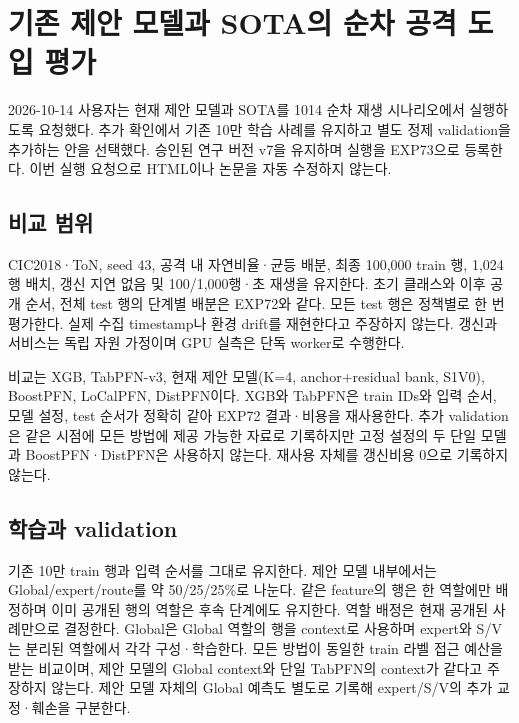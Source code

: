 \section{기존 제안 모델과 SOTA의 순차 공격 도입 평가}
2026-10-14 사용자는 현재 제안 모델과 SOTA를 1014 순차 재생 시나리오에서 실행하도록 요청했다. 추가 확인에서 기존 10만 학습 사례를 유지하고 별도 정제 validation을 추가하는 안을 선택했다. 승인된 연구 버전 v7을 유지하며 실행을 EXP73으로 등록한다. 이번 실행 요청으로 HTML이나 논문을 자동 수정하지 않는다.

\subsection{비교 범위}
CIC2018·ToN, seed 43, 공격 내 자연비율·균등 배분, 최종 100,000 train 행, 1,024행 배치, 갱신 지연 없음 및 100/\allowbreak{}1,000행·초 재생을 유지한다. 초기 클래스와 이후 공개 순서, 전체 test 행의 단계별 배분은 EXP72와 같다. 모든 test 행은 정책별로 한 번 평가한다. 실제 수집 timestamp나 환경 drift를 재현한다고 주장하지 않는다. 갱신과 서비스는 독립 자원 가정이며 GPU 실측은 단독 worker로 수행한다.

비교는 XGB, TabPFN-v3, 현재 제안 모델(K=\allowbreak{}4, anchor+\allowbreak{}residual bank, S1V0), BoostPFN, LoCalPFN, DistPFN이다. XGB와 TabPFN은 train IDs와 입력 순서, 모델 설정, test 순서가 정확히 같아 EXP72 결과·비용을 재사용한다. 추가 validation은 같은 시점에 모든 방법에 제공 가능한 자료로 기록하지만 고정 설정의 두 단일 모델과 BoostPFN·DistPFN은 사용하지 않는다. 재사용 자체를 갱신비용 0으로 기록하지 않는다.

\subsection{학습과 validation}
기존 10만 train 행과 입력 순서를 그대로 유지한다. 제안 모델 내부에서는 Global/\allowbreak{}expert/\allowbreak{}route를 약 50/\allowbreak{}25/\allowbreak{}25\%로 나눈다. 같은 feature의 행은 한 역할에만 배정하며 이미 공개된 행의 역할은 후속 단계에도 유지한다. 역할 배정은 현재 공개된 사례만으로 결정한다. Global은 Global 역할의 행을 context로 사용하며 expert와 S/\allowbreak{}V는 분리된 역할에서 각각 구성·학습한다. 모든 방법이 동일한 train 라벨 접근 예산을 받는 비교이며, 제안 모델의 Global context와 단일 TabPFN의 context가 같다고 주장하지 않는다. 제안 모델 자체의 Global 예측도 별도로 기록해 expert/\allowbreak{}S/\allowbreak{}V의 추가 교정·훼손을 구분한다.

